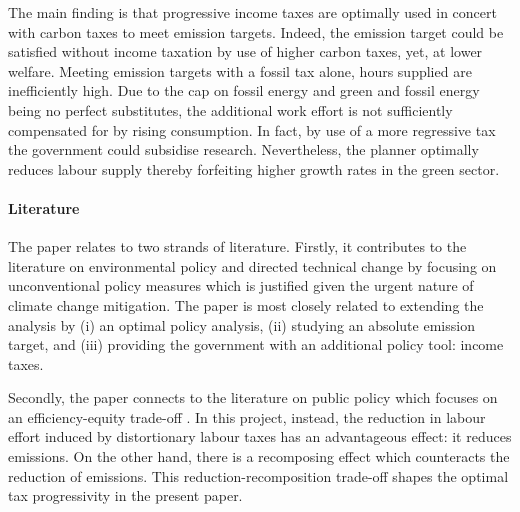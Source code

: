 The main finding is that progressive income taxes are optimally used in concert with carbon taxes to meet emission targets. Indeed, the emission target could be satisfied without income taxation by use of higher carbon taxes, yet, at lower welfare.  
Meeting emission targets with a fossil tax alone, hours supplied are inefficiently high. Due to the cap on fossil energy and green and fossil energy being no perfect substitutes, the additional work effort is not sufficiently compensated for by rising consumption.  
In fact, by use of a more regressive tax the government could subsidise research. Nevertheless, the planner optimally reduces labour supply thereby forfeiting higher growth rates in the green sector. %

\paragraph{Literature}
The paper relates to two strands of literature. Firstly, it contributes to the literature on environmental policy and directed technical change \citep[e.g.][]{Acemoglu2012TheChange, Acemoglu2016TransitionTechnology} by focusing on unconventional policy measures which is justified given the urgent nature of climate change mitigation.  The paper is most closely related to \cite{Fried2018ClimateAnalysis} extending the analysis by (i) an optimal policy analysis, (ii) studying an absolute emission target, and (iii) providing the government with an additional policy tool: income taxes.

Secondly, the paper connects to the literature on public policy which focuses on an efficiency-equity trade-off \citep{Heathcote2017OptimalFramework, Loebbing2019NationalChange}. In this project, instead, the reduction in labour effort induced by distortionary labour taxes has an advantageous effect: it reduces emissions. On the other hand, there is a recomposing effect which counteracts the reduction of emissions. This reduction-recomposition trade-off shapes the optimal tax progressivity in the present paper. 



